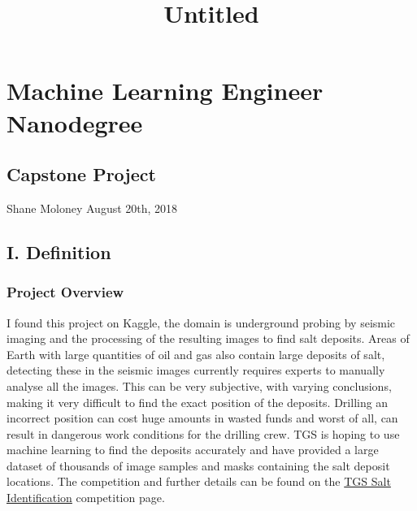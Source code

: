 \documentclass[11pt]{article}
\title{Untitled}
\begin{document}
    
    
    \maketitle
    
    

    
    \section{Machine Learning Engineer
Nanodegree}\label{machine-learning-engineer-nanodegree}

\subsection{Capstone Project}\label{capstone-project}

Shane Moloney August 20th, 2018

\subsection{I. Definition}\label{i.-definition}

\subsubsection{Project Overview}\label{project-overview}

I found this project on Kaggle, the domain is underground probing by
seismic imaging and the processing of the resulting images to find salt
deposits. Areas of Earth with large quantities of oil and gas also
contain large deposits of salt, detecting these in the seismic images
currently requires experts to manually analyse all the images. This can
be very subjective, with varying conclusions, making it very difficult
to find the exact position of the deposits. Drilling an incorrect
position can cost huge amounts in wasted funds and worst of all, can
result in dangerous work conditions for the drilling crew. TGS is hoping
to use machine learning to find the deposits accurately and have
provided a large dataset of thousands of image samples and masks
containing the salt deposit locations. The competition and further
details can be found on the
\href{https://www.kaggle.com/c/tgs-salt-identification-challenge}{TGS
Salt Identification} competition page.
\end{document}

